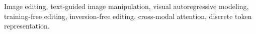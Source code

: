 \begin{abstract}
while using a 2B-parameter backbone --- six times smaller than the flow-based baselines --- in an inversion-free pipeline that runs in about 2.5 seconds per image.
\end{abstract}

\begin{IEEEkeywords}
Image editing, text-guided image manipulation, visual autoregressive modeling, training-free editing, inversion-free editing, cross-modal attention, discrete token representation.
\end{IEEEkeywords}
